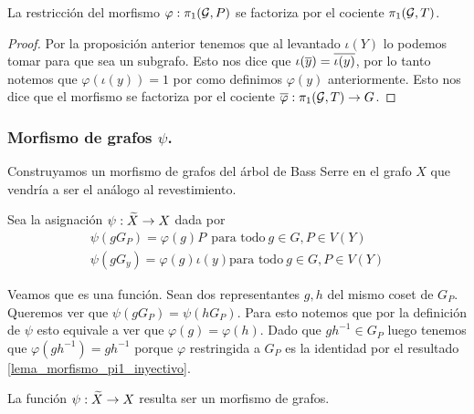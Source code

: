 \documentclass[tesis.tex]{subfiles}
\begin{document}
\begin{coro}
	La restricción del morfismo $\varphi: \pi_1({\cal G}, P)$ se factoriza por el cociente $\pi_1({\cal G}, T)$.
\end{coro}
\begin{proof}
	Por la proposición anterior tenemos que al levantado $\iota(Y)$ lo podemos tomar para que sea un subgrafo.
	Esto nos dice que $\iota(\overline y) = \overline {\iota (y)}$, por lo tanto notemos que $\varphi(\iota(y)) = 1$ por como definimos $\varphi(y)$ anteriormente.
	Esto nos dice que el morfismo se factoriza por el cociente $\overline \varphi:\pi_1({\cal G}, T) \to G$.
\end{proof}

\subsubsection{Morfismo de grafos $\psi$.}

Construyamos un morfismo de grafos del árbol de Bass Serre en el grafo $X$ que vendría a ser el análogo al revestimiento.

Sea la asignación $\psi: \widetilde X \to X$ dada por 
\begin{align*}
	\psi(g G_P ) = \varphi(g) P \ \ \text{para todo} \ g \in G, P \in V(Y) \\
	\psi(g G_y ) = \varphi(g) \iota(y) \text{para todo} \ g \in G, P \in V(Y)
\end{align*}

Veamos que es una función.
Sean dos representantes $g,h$ del mismo coset de $G_P$. 
Queremos ver que $\psi(gG_P) = \psi(hG_P)$.
Para esto notemos que por la definición de $\psi$  esto equivale a ver que $\varphi(g) = \varphi(h)$.
Dado que $gh^{-1} \in G_P$ luego tenemos que $\varphi(gh^{-1}) = gh^{-1}$ porque $\varphi$ restringida a $G_P$ es la identidad por el resultado \ref{lema_morfismo_pi1_inyectivo}.

\begin{lema}
	La función $\psi: \widetilde X \to X$ resulta ser un morfismo de grafos.
\end{lema}
\end{document}
